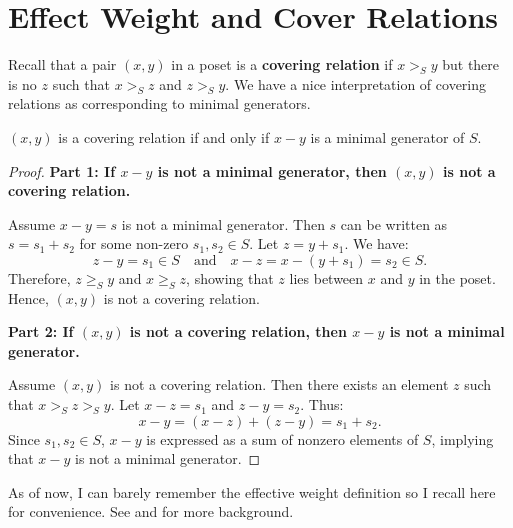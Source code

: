 \documentclass[11pt]{article}
\begin{document}
\iffalse
\begin{proof}
    Each relation in the gap poset corresponds to a box in the Ferrers diagram of the partition. Since every box represents a unique relation where a hook \( h \) can be determined from a gap \( f \) and a semigroup element \( s \), the total number of such relations is precisely the number of boxes in the partition.
\end{proof}
\fi

\newpage
\section{Effect Weight and Cover Relations}

Recall that a pair \((x, y)\) in a poset is a \textbf{covering relation} if \(x >_S y\) but there is no \(z\) such that \(x  >_S z\) and \(z >_S y\). We have a nice interpretation of covering relations as corresponding to minimal generators.

\begin{proposition}
    \((x, y)\) is a covering relation if and only if \(x - y\) is a minimal generator of \(S\).
\end{proposition}

\begin{proof}
    \textbf{Part 1: If \(x - y\) is not a minimal generator, then \((x, y)\) is not a covering relation.}

    Assume \(x - y = s\) is not a minimal generator. Then \(s\) can be written as \(s = s_1 + s_2\) for some non-zero \(s_1, s_2 \in S\). Let \(z = y + s_1\). We have:
    \[
    z - y = s_1 \in S \quad \text{and} \quad x - z = x - (y + s_1) = s_2 \in S.
    \]
    Therefore, \(z \ge_S y\) and \(x \ge_S z\), showing that \(z\) lies between \(x\) and \(y\) in the poset. Hence, \((x, y)\) is not a covering relation.

    \textbf{Part 2: If \((x, y)\) is not a covering relation, then \(x - y\) is not a minimal generator.}

    Assume \((x, y)\) is not a covering relation. Then there exists an element \(z\) such that \(x >_S z >_S y\). Let \(x - z = s_1\) and \(z - y = s_2\). Thus:
    \[
    x - y = (x - z) + (z - y) = s_1 + s_2.
    \]
    Since \(s_1, s_2 \in S\), \(x - y\) is expressed as a sum of nonzero elements of \(S\), implying that \(x - y\) is not a minimal generator.
\end{proof}

As of now, I can barely remember the effective weight definition so I recall here for convenience. See \cite{Pflueger_2018} and \cite{kaplan2019families} for more background.
\end{document}
